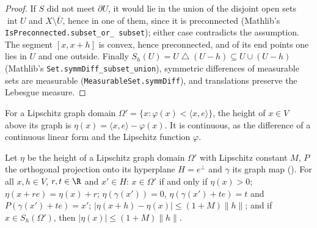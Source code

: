 \begin{proof}
\leanok
If $S$ did not meet $\partial U$, it would lie in the union of the disjoint open sets
$\operatorname{int} U$ and $X \setminus \overline U$, hence in one of them, since it is
preconnected (Mathlib's \texttt{IsPreconnected.\allowbreak subset\_\allowbreak or\_\allowbreak
subset}); either case contradicts the assumption. The segment $[x, x + h]$ is convex, hence
preconnected, and of its end points one lies in $U$ and one outside. Finally
$S_h(U) = U \mathbin{\triangle} (U - h) \subseteq U \cup (U - h)$ (Mathlib's
\texttt{Set.\allowbreak symmDiff\_\allowbreak subset\_\allowbreak union}), symmetric differences
of measurable sets are measurable (\texttt{MeasurableSet.\allowbreak symmDiff}), and translations
preserve the Lebesgue measure.
\end{proof}

\begin{definition}
\label{def:graph-height}
\leanok
{}
For a Lipschitz graph domain $\Omega' = \{x : \varphi(x) < \langle x, e \rangle\}$, the height of
$x \in V$ above its graph is $\eta(x) = \langle x, e \rangle - \varphi(x)$. It is continuous, as
the difference of a continuous linear form and the Lipschitz function $\varphi$.
\end{definition}

\begin{lemma}
\label{lem:graph-height}
\leanok
{}
Let $\eta$ be the height of a Lipschitz graph domain $\Omega'$ with Lipschitz constant $M$, $P$
the orthogonal projection onto its hyperplane $H = e^\perp$ and $\gamma$ its graph map
(). For all $x, h \in V$, $r, t \in \R$ and $x' \in H$:
$x \in \Omega'$ if and only if $\eta(x) > 0$; $\eta(x + r e) = \eta(x) + r$;
$\eta(\gamma(x')) = 0$, $\eta(\gamma(x') + t e) = t$ and $P(\gamma(x') + t e) = x'$;
$|\eta(x + h) - \eta(x)| \leq (1 + M) \|h\|$; and if $x \in S_h(\Omega')$, then
$|\eta(x)| \leq (1 + M) \|h\|$.
\end{lemma}

